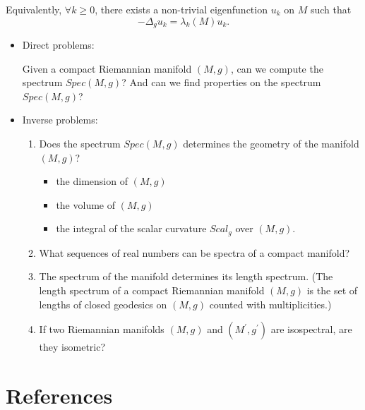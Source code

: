 \documentclass{article}
\begin{document}
Equivalently, $\forall k \geq 0$, there exists a non-trivial eigenfunction $u_k$ on $M$  such that 
$$-\Delta_g u_k = \lambda_k(M) u_k.$$

\begin{itemize}
    \item Direct problems: 
    
    Given a compact Riemannian manifold $(M,g)$, can we compute the spectrum $Spec(M,g)$? And can we find properties on the spectrum $Spec(M,g)$?
    \item Inverse problems: 
    \begin{enumerate}
        \item Does the spectrum $Spec(M,g)$ determines the geometry of the manifold $(M,g)$? 
        \begin{itemize}
            \item the dimension of $(M,g)$
            \item the volume of $(M,g)$
            \item the integral of the scalar curvature $Scal_g$ over $(M,g)$.
        \end{itemize}
        
        \item What sequences of real numbers can be spectra of a compact manifold?
        
        \item The spectrum of the manifold determines its length spectrum. (The length spectrum of a compact Riemannian manifold $(M,g)$ is the set of lengths of closed geodesics on $(M,g)$ counted with multiplicities.)
        
        \item If two Riemannian manifolds $(M,g)$ and $(M^\prime,g^\prime)$ are isospectral, are they isometric?
    \end{enumerate}
    \end{itemize}
    
\section{References}


\end{document}
